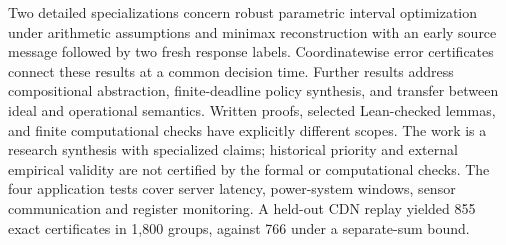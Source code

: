 Two detailed specializations concern robust parametric interval optimization under arithmetic assumptions and minimax reconstruction with an early source message followed by two fresh response labels. Coordinatewise error certificates connect these results at a common decision time. Further results address compositional abstraction, finite-deadline policy synthesis, and transfer between ideal and operational semantics. Written proofs, selected Lean-checked lemmas, and finite computational checks have explicitly different scopes. The work is a research synthesis with specialized claims; historical priority and external empirical validity are not certified by the formal or computational checks.
The four application tests cover server latency, power-system windows, sensor communication and register monitoring. A held-out CDN replay yielded 855 exact certificates in 1,800 groups, against 766 under a separate-sum bound.
\tableofcontents
\newpage










\newcommand{\edtext}[2]{#2}


\appendix




